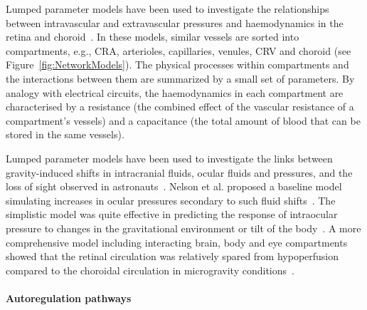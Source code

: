 \documentclass{article}
\begin{document}
Lumped parameter models have been used to investigate the relationships between intravascular and extravascular pressures and haemodynamics in the retina and choroid~\cite{Chiaravalli_2021,Fawzi_2019,Guidoboni_2014a,Nelson_2017,Petersen_2022,Prudhomme_2021,Sala_2020,Salerni_2019}.
In these models, similar vessels are sorted into compartments, e.g., CRA, arterioles, capillaries, venules, CRV and choroid (see Figure~\ref{fig:NetworkModels}).
The physical processes within compartments and the interactions between them are summarized by a small set of parameters.
By analogy with electrical circuits, the haemodynamics in each compartment are characterised by a resistance (the combined effect of the vascular resistance of a compartment's vessels) and a capacitance (the total amount of blood that can be stored in the same vessels).

Lumped parameter models have been used to investigate the links between gravity-induced shifts in intracranial fluids, ocular fluids and pressures, and the loss of sight observed in astronauts~\cite{Nelson_2017,Petersen_2022,Salerni_2019}.
Nelson et al. proposed a baseline model simulating increases in ocular pressures secondary to such fluid shifts~\cite{Nelson_2017}.
The simplistic model was quite effective in predicting the response of intraocular pressure to changes in the gravitational environment or tilt of the body~\cite{Nelson_2017,Petersen_2022}.
A more comprehensive model including interacting brain, body and eye compartments showed that the retinal circulation was relatively spared from hypoperfusion compared to the choroidal circulation in microgravity conditions~\cite{Salerni_2019}.


\paragraph*{Autoregulation pathways}
\end{document}
